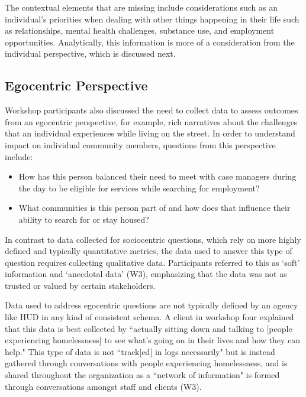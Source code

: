 The contextual elements that are missing include considerations such as an individual's priorities when dealing with other things happening in their life such as relationships, mental health challenges, substance use, and employment opportunities. Analytically, this information is more of a consideration from the individual perspective, which is discussed next.

\subsection{Egocentric Perspective}
Workshop participants also discussed the need to collect data to assess outcomes from an egocentric perspective, for example, rich narratives about the challenges that an individual experiences while living on the street. In order to understand impact on individual community members, questions from this perspective include:

\begin{itemize}
\item How has this person balanced their need to meet with case managers during the day to be eligible for services while searching for employment?
\item What communities is this person part of and how does that influence their ability to search for or stay housed?
\end{itemize}

In contrast to data collected for sociocentric questions, which rely on more highly defined and typically quantitative metrics, the data used to answer this type of question requires collecting qualitative data. Participants referred to this as `soft' information and `anecdotal data' (W3), emphasizing that the data was not as trusted or valued by certain stakeholders.

Data used to address egocentric questions are not typically defined by an agency like HUD in any kind of consistent schema. A client in workshop four explained that this data is best collected by ``actually sitting down and talking to [people experiencing homelessness] to see what's going on in their lives and how they can help." This type of data is not ``track[ed] in logs necessarily" but is instead gathered through conversations with people experiencing homelessness, and is shared throughout the organization as a ``network of information" is formed through conversations amongst staff and clients (W3).

